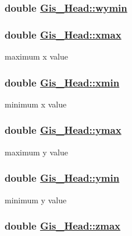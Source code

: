 \hypertarget{structGis__Head_o11}{
\subsubsection[wymin]{\setlength{\rightskip}{0pt plus 5cm}double \hyperlink{structGis__Head_o11}{Gis\_\-Head::wymin}}}
\label{structGis__Head_o11}


\hypertarget{structGis__Head_o3}{
\subsubsection[xmax]{\setlength{\rightskip}{0pt plus 5cm}double \hyperlink{structGis__Head_o3}{Gis\_\-Head::xmax}}}
\label{structGis__Head_o3}


maximum x value 

\hypertarget{structGis__Head_o2}{
\subsubsection[xmin]{\setlength{\rightskip}{0pt plus 5cm}double \hyperlink{structGis__Head_o2}{Gis\_\-Head::xmin}}}
\label{structGis__Head_o2}


minimum x value 

\hypertarget{structGis__Head_o5}{
\subsubsection[ymax]{\setlength{\rightskip}{0pt plus 5cm}double \hyperlink{structGis__Head_o5}{Gis\_\-Head::ymax}}}
\label{structGis__Head_o5}


maximum y value 

\hypertarget{structGis__Head_o4}{
\subsubsection[ymin]{\setlength{\rightskip}{0pt plus 5cm}double \hyperlink{structGis__Head_o4}{Gis\_\-Head::ymin}}}
\label{structGis__Head_o4}


minimum y value 

\hypertarget{structGis__Head_o1}{
\subsubsection[zmax]{\setlength{\rightskip}{0pt plus 5cm}double \hyperlink{structGis__Head_o1}{Gis\_\-Head::zmax}}}
\label{structGis__Head_o1}


